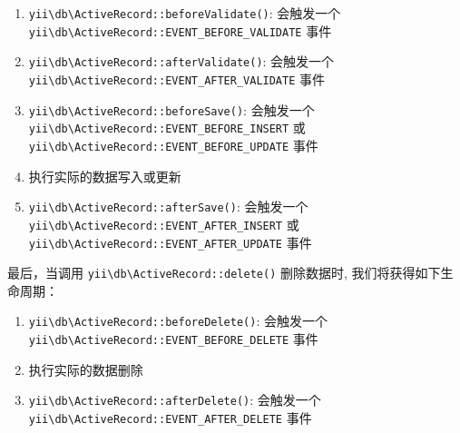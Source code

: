 \begin{enumerate}
\item \texttt{yii{\allowbreak{}\textbackslash}db{\allowbreak{}\textbackslash}ActiveRecord\allowbreak{}::\allowbreak{}beforeValidate()}: 会触发一个 \texttt{yii{\allowbreak{}\textbackslash}db{\allowbreak{}\textbackslash}ActiveRecord\allowbreak{}::\allowbreak{}EVENT\_BEFORE\_VALIDATE} 事件
\item \texttt{yii{\allowbreak{}\textbackslash}db{\allowbreak{}\textbackslash}ActiveRecord\allowbreak{}::\allowbreak{}afterValidate()}: 会触发一个 \texttt{yii{\allowbreak{}\textbackslash}db{\allowbreak{}\textbackslash}ActiveRecord\allowbreak{}::\allowbreak{}EVENT\_AFTER\_VALIDATE} 事件
\item \texttt{yii{\allowbreak{}\textbackslash}db{\allowbreak{}\textbackslash}ActiveRecord\allowbreak{}::\allowbreak{}beforeSave()}: 会触发一个 \texttt{yii{\allowbreak{}\textbackslash}db{\allowbreak{}\textbackslash}ActiveRecord\allowbreak{}::\allowbreak{}EVENT\_BEFORE\_INSERT} 或 \texttt{yii{\allowbreak{}\textbackslash}db{\allowbreak{}\textbackslash}ActiveRecord\allowbreak{}::\allowbreak{}EVENT\_BEFORE\_UPDATE} 事件
\item 执行实际的数据写入或更新
\item \texttt{yii{\allowbreak{}\textbackslash}db{\allowbreak{}\textbackslash}ActiveRecord\allowbreak{}::\allowbreak{}afterSave()}: 会触发一个 \texttt{yii{\allowbreak{}\textbackslash}db{\allowbreak{}\textbackslash}ActiveRecord\allowbreak{}::\allowbreak{}EVENT\_AFTER\_INSERT} 或 \texttt{yii{\allowbreak{}\textbackslash}db{\allowbreak{}\textbackslash}ActiveRecord\allowbreak{}::\allowbreak{}EVENT\_AFTER\_UPDATE} 事件
\end{enumerate}
最后，当调用 \texttt{yii{\allowbreak{}\textbackslash}db{\allowbreak{}\textbackslash}ActiveRecord\allowbreak{}::\allowbreak{}delete()} 删除数据时, 我们将获得如下生命周期：

\begin{enumerate}
\item \texttt{yii{\allowbreak{}\textbackslash}db{\allowbreak{}\textbackslash}ActiveRecord\allowbreak{}::\allowbreak{}beforeDelete()}: 会触发一个 \texttt{yii{\allowbreak{}\textbackslash}db{\allowbreak{}\textbackslash}ActiveRecord\allowbreak{}::\allowbreak{}EVENT\_BEFORE\_DELETE} 事件
\item 执行实际的数据删除
\item \texttt{yii{\allowbreak{}\textbackslash}db{\allowbreak{}\textbackslash}ActiveRecord\allowbreak{}::\allowbreak{}afterDelete()}: 会触发一个 \texttt{yii{\allowbreak{}\textbackslash}db{\allowbreak{}\textbackslash}ActiveRecord\allowbreak{}::\allowbreak{}EVENT\_AFTER\_DELETE} 事件
\end{enumerate}
